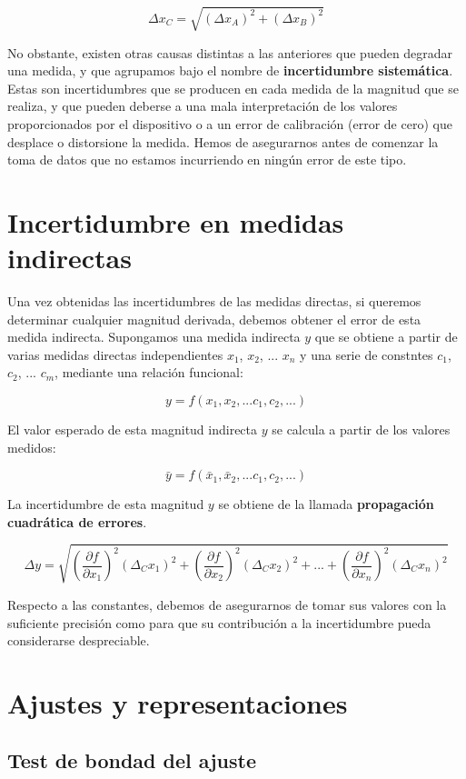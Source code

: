 \documentclass{book}
\begin{document}
\begin{equation}
  \Delta x_C = \sqrt{(\Delta x_A)^2 + (\Delta x_B)^2}
\end{equation}

No obstante, existen otras causas distintas a las anteriores que pueden degradar una medida, y
que agrupamos bajo el nombre de \textbf{incertidumbre sistemática}. Estas son incertidumbres que se producen
en cada medida de la magnitud que se realiza, y que pueden deberse a una mala interpretación de
los valores proporcionados por el dispositivo o a un error de calibración (error de cero) que
desplace o distorsione la medida. Hemos de asegurarnos antes de comenzar la toma de datos que no
estamos incurriendo en ningún error de este tipo.

\section{Incertidumbre en medidas indirectas}

Una vez obtenidas las incertidumbres de las medidas directas, si queremos determinar cualquier
magnitud derivada, debemos obtener el error de esta medida indirecta. Supongamos una medida
indirecta $y$ que se obtiene a partir de varias medidas directas independientes $x_1$, $x_2$, 
... $x_n$  y una serie de constntes $c_1$, $c_2$, ... $c_m$, mediante una relación funcional:

\begin{equation}
  y = f(x_1, x_2, ... c_1, c_2, ...)
\end{equation}

El valor esperado de esta magnitud indirecta $y$ se calcula a partir de los valores medidos:

\begin{equation}
  \bar{y} = f(\bar{x}_1, \bar{x}_2, ... c_1, c_2, ...)
\end{equation}

La incertidumbre de esta magnitud $y$ se obtiene de la llamada \textbf{propagación cuadrática de 
errores}.

\begin{equation}
  \Delta y = \sqrt{ \left( \frac{\partial f}{\partial x_1} \right)^2 (\Delta_C x_1)^2 + 
  \left( \frac{\partial f}{\partial x_2} \right)^2 (\Delta_C x_2)^2 + ... +
  \left( \frac{\partial f}{\partial x_n} \right)^2 (\Delta_C x_n)^2}
\end{equation}

Respecto a las constantes, debemos de asegurarnos de tomar sus valores con la suficiente precisión
como para que su contribución a la incertidumbre pueda considerarse despreciable.

\section{Ajustes y representaciones}

\subsection{Test de bondad del ajuste}
\end{document}
